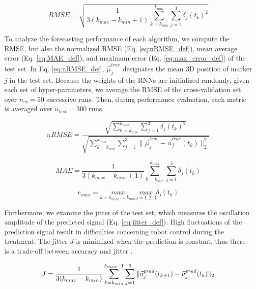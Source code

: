 \documentclass[twocolumn,a4paper]{svjour3} \sloppy          \smartqed
\begin{document}
\begin{equation} \label{eq:RMSE_def}
 RMSE = \sqrt{\frac{1}{3(k_{max}-k_{min}+1)} \sum_{k = k_{min}}^{k_{max}} \sum_{j = 1}^{3}
 	\delta_j(t_k)^2
 	}
\end{equation}

To analyze the forecasting performance of each algorithm, we compute the RMSE, but also the normalized RMSE (Eq. \ref{eq:nRMSE_def}), mean average error (Eq. \ref{eq:MAE_def}), and maximum error (Eq. \ref{eq:max_error_def}) of the test set.  In Eq. \ref{eq:nRMSE_def}, $\vec{\mu}_j^{true}$ designates the mean 3D position of marker $j$ in the test set. Because the weights of the RNNs are initialized randomly, given each set of hyper-parameters, we average the RMSE of the cross-validation set over $n_{cv} = 50$ successive runs. Then, during performance evaluation, each metric is averaged over $n_{test} = 300$ runs.

\begin{equation} \label{eq:nRMSE_def}
 nRMSE = \frac{\sqrt{\sum_{k = k_{min}}^{k_{max}} \sum_{j =1}^3
 						\delta_j(t_k)^2}}
 				 {\sqrt{\sum_{k = k_{min}}^{k_{max}} \sum_{j =1}^3
 				 		\| \vec{\mu}_j^{true} - \vec{u}_j^{true}(t_k) \|_2^2}}
\end{equation}

\begin{equation} \label{eq:MAE_def}
 MAE = \frac{1}{3(k_{max}-k_{min}+1)} \sum_{k = k_{min}}^{k_{max}} \sum_{j =1}^3
	\delta_j(t_k) 
\end{equation} 

\begin{equation}\label{eq:max_error_def}
 e_{max} = \underset{k = k_{min}, ..., k_{max}}{max} \underset{j =1, 2, 3}{max}
 	\delta_j(t_k) 
\end{equation}

Furthermore, we examine the jitter of the test set, which measures the oscillation amplitude of the predicted signal (Eq. \ref{eq:jitter_def}). High fluctuations of the prediction signal result in difficulties concerning robot control during the treatment. The jitter $J$ is minimized when the prediction is constant, thus there is a trade-off between accuracy and jitter \cite{krilavicius2016predicting}.

\begin{equation} \label{eq:jitter_def}
\small
 J = \frac{1}{3(k_{max}-k_{min})} \sum_{k = k_{min}}^{k_{max}-1} \sum_{j =1}^3
	\| \vec{u}_j^{pred}(t_{k+1}) - \vec{u}_j^{pred}(t_k) \|_2 
\end{equation} 
\end{document}
